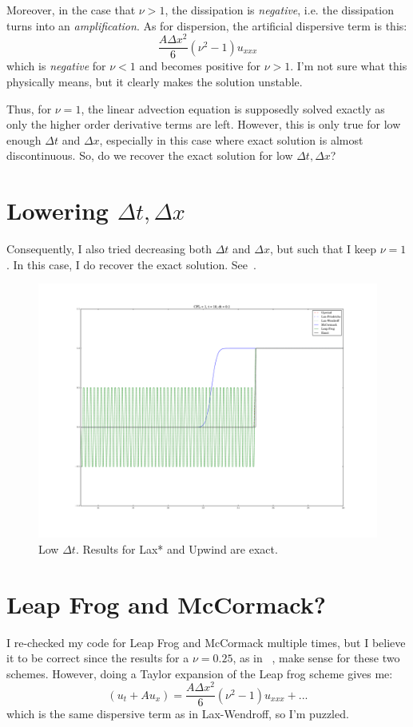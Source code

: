\documentclass[a4paper]{article}
\begin{document}
Moreover, in the case that $\nu > 1$, the dissipation is \emph{negative}, i.e. the dissipation turns into an \emph{amplification}. As for dispersion, the artificial dispersive term is this:
\begin{equation}
\label{eq:dispersion}
\frac{A\Delta x^2}{6}(\nu^2 - 1)u_{xxx}
\end{equation}
which is \emph{negative} for $\nu < 1$ and becomes positive for $\nu > 1$. I'm not sure what this physically means, but it clearly makes the solution unstable.

Thus, for $\nu = 1$, the linear advection equation is supposedly solved exactly as only the higher order derivative terms are left. However, this is only true for low enough $\Delta t$ and $\Delta x$, especially in this case where exact solution is almost discontinuous. So, do we recover the exact solution for low $\Delta t, \Delta x$?

\section{Lowering $\Delta t, \Delta x$}
Consequently, I also tried decreasing both $\Delta t$ and $\Delta x$, but such that I keep $\nu = 1$. In this case, I do recover the exact solution. See~.
\begin{figure}
    \centering
    \includegraphics[width=1.0\textwidth]{lowdt.pdf}
    \caption{Low $\Delta t$. Results for Lax* and Upwind are exact.}\label{fig:lowdt}
\end{figure}

\section{Leap Frog and McCormack?}
I re-checked my code for Leap Frog and McCormack multiple times, but I believe it to be correct since the results for a $\nu = 0.25$, as in ~, make sense for these two schemes. However, doing a Taylor expansion of the Leap frog scheme gives me:
\begin{equation}
(u_t + Au_x) = \frac{A\Delta x^2}{6}(\nu^2 - 1)u_{xxx} + ...
\end{equation}
which is the same dispersive term as in Lax-Wendroff, so I'm puzzled.
\end{document}
